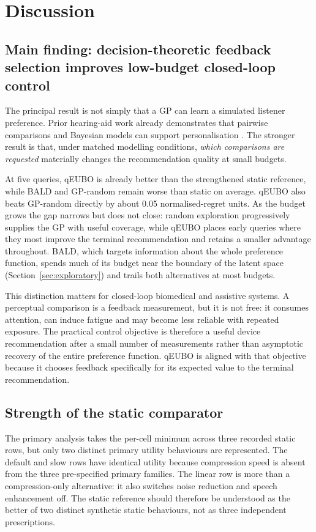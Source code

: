 \documentclass[preprint,12pt]{elsarticle}
\begin{document}
\section{Discussion}
\label{sec:discussion}

\subsection{Main finding: decision-theoretic feedback selection improves low-budget closed-loop control}

The principal result is not simply that a GP can learn a simulated listener preference. Prior hearing-aid work already demonstrates that pairwise comparisons and Bayesian models can support personalisation \cite{birlutiu2010,nielsen2015,vyas2022,ni2024}. The stronger result is that, under matched modelling conditions, \emph{which comparisons are requested} materially changes the recommendation quality at small budgets.

At five queries, qEUBO is already better than the strengthened static reference, while BALD and GP-random remain worse than static on average. qEUBO also beats GP-random directly by about 0.05 normalised-regret units. As the budget grows the gap narrows but does not close: random exploration progressively supplies the GP with useful coverage, while qEUBO places early queries where they most improve the terminal recommendation and retains a smaller advantage throughout. BALD, which targets information about the whole preference function, spends much of its budget near the boundary of the latent space (Section~\ref{sec:exploratory}) and trails both alternatives at most budgets.

This distinction matters for closed-loop biomedical and assistive systems. A perceptual comparison is a feedback measurement, but it is not free: it consumes attention, can induce fatigue and may become less reliable with repeated exposure. The practical control objective is therefore a useful device recommendation after a small number of measurements rather than asymptotic recovery of the entire preference function. qEUBO is aligned with that objective because it chooses feedback specifically for its expected value to the terminal recommendation.

\subsection{Strength of the static comparator}

The primary analysis takes the per-cell minimum across three recorded static rows, but only two distinct primary utility behaviours are represented. The default and slow rows have identical utility because compression speed is absent from the three pre-specified primary families. The linear row is more than a compression-only alternative: it also switches noise reduction and speech enhancement off. The static reference should therefore be understood as the better of two distinct synthetic static behaviours, not as three independent prescriptions.
\end{document}
